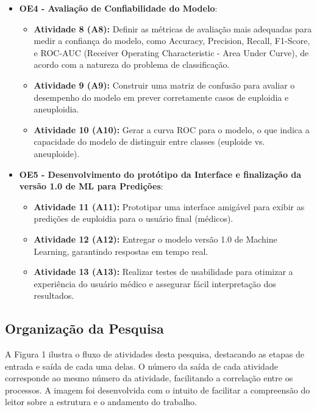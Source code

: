 \begin{itemize}
\begin{itemize}
        \item \textbf{OE4 - Avaliação de Confiabilidade do Modelo}: 
        \begin{itemize}
            \item \textbf{Atividade 8 (A8):} Definir as métricas de avaliação mais adequadas para medir a confiança do modelo, como Accuracy, Precision, Recall, F1-Score, e ROC-AUC (Receiver Operating Characteristic - Area Under Curve), de acordo com a natureza do problema de classificação.
            \item \textbf{Atividade 9 (A9):} Construir uma matriz de confusão para avaliar o desempenho do modelo em prever corretamente casos de euploidia e aneuploidia.
            \item \textbf{Atividade 10 (A10):} Gerar a curva ROC para o modelo, o que indica a capacidade do modelo de distinguir entre classes (euploide vs. aneuploide).
        \end{itemize}

        \item \textbf{OE5 - Desenvolvimento do protótipo da Interface e finalização da versão 1.0 de ML para Predições}: 
        \begin{itemize}
            \item \textbf{Atividade 11 (A11):} Prototipar uma interface amigável para exibir as predições de euploidia para o usuário final (médicos).
            \item \textbf{Atividade 12 (A12):} Entregar o modelo versão 1.0 de Machine Learning, garantindo respostas em tempo real.
            \item \textbf{Atividade 13 (A13):} Realizar testes de usabilidade para otimizar a experiência do usuário médico e assegurar fácil interpretação dos resultados.
        \end{itemize}
    \end{itemize}
\end{itemize}

\subsection{Organização da Pesquisa}
A Figura 1 ilustra o fluxo de atividades desta pesquisa, destacando as etapas de entrada e saída de cada uma delas. O número da saída de cada atividade corresponde ao mesmo número da atividade, facilitando a correlação entre os processos. A imagem foi desenvolvida com o intuito de facilitar a compreensão do leitor sobre a estrutura e o andamento do trabalho.

